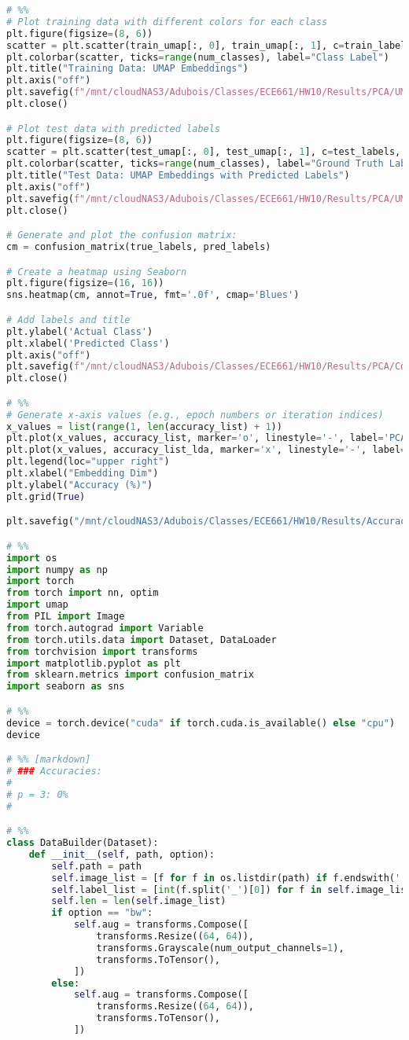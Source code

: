 \documentclass{article}
\begin{document}
\begin{lstlisting}[language=Python]
# %%
# Plot training data with different colors for each class
plt.figure(figsize=(8, 6))
scatter = plt.scatter(train_umap[:, 0], train_umap[:, 1], c=train_labels, cmap='tab20', alpha=0.7)
plt.colorbar(scatter, ticks=range(num_classes), label="Class Label")
plt.title("Training Data: UMAP Embeddings")
plt.axis("off")
plt.savefig(f"/mnt/cloudNAS3/Adubois/Classes/ECE661/HW10/Results/PCA/UMAP/train_umap_{p}.jpg")
plt.close()

# Plot test data with predicted labels
plt.figure(figsize=(8, 6))
scatter = plt.scatter(test_umap[:, 0], test_umap[:, 1], c=test_labels, cmap='tab20', alpha=0.7)
plt.colorbar(scatter, ticks=range(num_classes), label="Ground Truth Label")
plt.title("Test Data: UMAP Embeddings with Predicted Labels")
plt.axis("off")
plt.savefig(f"/mnt/cloudNAS3/Adubois/Classes/ECE661/HW10/Results/PCA/UMAP/test_umap_{p}.jpg")
plt.close()

# Generate and plot the confusion matrix:
cm = confusion_matrix(true_labels, pred_labels)

# Create a heatmap using Seaborn
plt.figure(figsize=(16, 16))
sns.heatmap(cm, annot=True, fmt='.0f', cmap='Blues')

# Add labels and title
plt.ylabel('Actual Class')
plt.xlabel('Predicted Class')
plt.axis("off")
plt.savefig(f"/mnt/cloudNAS3/Adubois/Classes/ECE661/HW10/Results/PCA/Confusion_Mat/conf_mat_{p}.jpg")
plt.close()

# %%
# Generate x-axis values (e.g., epoch numbers or iteration indices)
x_values = list(range(1, len(accuracy_list) + 1))
plt.plot(x_values, accuracy_list, marker='o', linestyle='-', label='PCA')
plt.plot(x_values, accuracy_list_lda, marker='x', linestyle='-', label='LDA')
plt.legend(loc="upper right")
plt.xlabel("Embedding Dim")
plt.ylabel("Accuracy (%)")
plt.grid(True)

plt.savefig("/mnt/cloudNAS3/Adubois/Classes/ECE661/HW10/Results/Accuracy/PCA.jpg")

# %%
import os
import numpy as np
import torch
from torch import nn, optim
import umap
from PIL import Image
from torch.autograd import Variable
from torch.utils.data import Dataset, DataLoader
from torchvision import transforms
import matplotlib.pyplot as plt
from sklearn.metrics import confusion_matrix
import seaborn as sns

# %%
device = torch.device("cuda" if torch.cuda.is_available() else "cpu")
device

# %% [markdown]
# ### Accuracies:
# 
# p = 3: 0%  
# 

# %%
class DataBuilder(Dataset):
    def __init__(self, path, option):
        self.path = path
        self.image_list = [f for f in os.listdir(path) if f.endswith('.png')]
        self.label_list = [int(f.split('_')[0]) for f in self.image_list]
        self.len = len(self.image_list)
        if option == "bw":
            self.aug = transforms.Compose([
                transforms.Resize((64, 64)),
                transforms.Grayscale(num_output_channels=1),
                transforms.ToTensor(),
            ])
        else:
            self.aug = transforms.Compose([
                transforms.Resize((64, 64)),
                transforms.ToTensor(),
            ])


\end{lstlisting}
\end{document}
